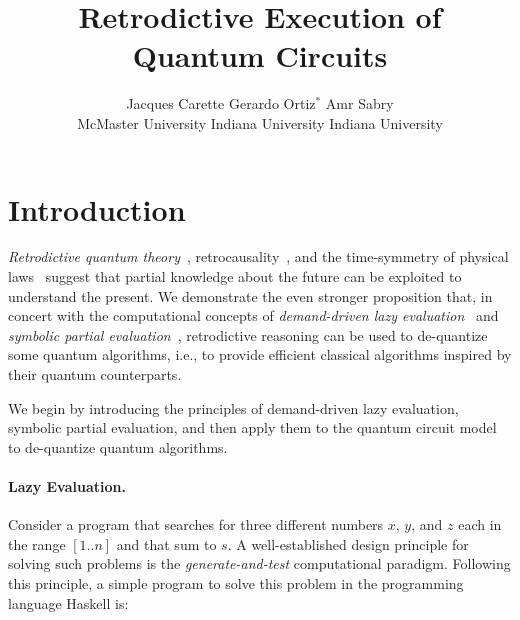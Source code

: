 \documentclass{article}
\title{Retrodictive Execution of Quantum Circuits}
\author{Jacques Carette \qquad Gerardo Ortiz$^{*}$ \qquad Amr Sabry \\
McMaster University \qquad Indiana University \qquad Indiana University}
\begin{document}
\maketitle

\begin{abstract}
\end{abstract}


\section{Introduction}

\emph{Retrodictive quantum theory}~\cite{sym13040586},
retrocausality~\cite{Aharonov2008}, and the time-symmetry of physical
laws~\cite{RevModPhys.27.179} suggest that partial knowledge about the
future can be exploited to understand the present. We demonstrate the
even stronger proposition that, in concert with the computational
concepts of \emph{demand-driven lazy evaluation}~\cite{lazyevaluator}
and \emph{symbolic partial evaluation}~\cite{futamura}, retrodictive
reasoning can be used to de-quantize some quantum algorithms, i.e., to
provide efficient classical algorithms inspired by their quantum
counterparts.

We begin by introducing the principles of demand-driven lazy
evaluation, symbolic partial evaluation, and then apply them to the
quantum circuit model to de-quantize quantum algorithms.

\paragraph*{Lazy Evaluation.}
Consider a program that searches for three different numbers $x$, $y$,
and $z$ each in the range $[1..n]$ and that sum to $s$. A
well-established design principle for solving such problems is the
\emph{generate-and-test} computational paradigm. Following this
principle, a simple program to solve this problem in the programming
language Haskell is:
\end{document}
